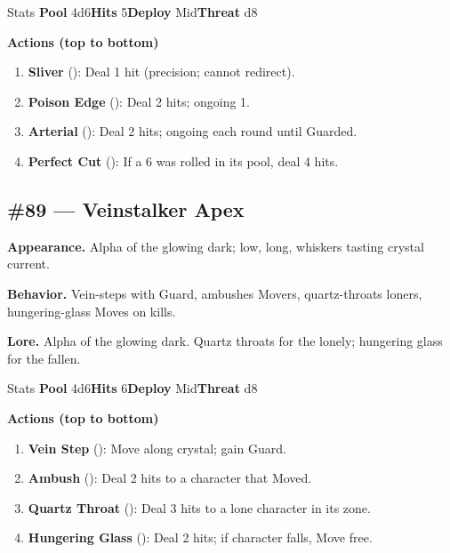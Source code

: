 \begin{monsterentry}{Stats}
\textbf{Pool} 4d6\quad\textbf{Hits} 5\quad\textbf{Deploy} Mid\quad\textbf{Threat} d8

\textbf{Actions (top to bottom)}
\begin{enumerate}\setlength{\itemsep}{0.15em}\setlength{\parskip}{0pt}
  \item \textbf{Sliver} (\easy): Deal 1 hit (precision; cannot redirect).
  \item \textbf{Poison Edge} (\medium): Deal 2 hits; ongoing 1.
  \item \textbf{Arterial} (\hard): Deal 2 hits; ongoing each round until Guarded.
  \item \textbf{Perfect Cut} (\hard): If a 6 was rolled in its pool, deal 4 hits.
\end{enumerate}
\end{monsterentry}

\subsection*{\#89 --- Veinstalker Apex}

\textbf{Appearance.} Alpha of the glowing dark; low, long, whiskers tasting crystal current.

\textbf{Behavior.} Vein-steps with Guard, ambushes Movers, quartz-throats loners, hungering-glass Moves on kills.

\textbf{Lore.} Alpha of the glowing dark. Quartz throats for the lonely; hungering glass for the fallen.

\begin{monsterentry}{Stats}
\textbf{Pool} 4d6\quad\textbf{Hits} 6\quad\textbf{Deploy} Mid\quad\textbf{Threat} d8

\textbf{Actions (top to bottom)}
\begin{enumerate}\setlength{\itemsep}{0.15em}\setlength{\parskip}{0pt}
  \item \textbf{Vein Step} (\easy): Move along crystal; gain Guard.
  \item \textbf{Ambush} (\medium): Deal 2 hits to a character that Moved.
  \item \textbf{Quartz Throat} (\hard): Deal 3 hits to a lone character in its zone.
  \item \textbf{Hungering Glass} (\hard): Deal 2 hits; if character falls, Move free.
\end{enumerate}
\end{monsterentry}

